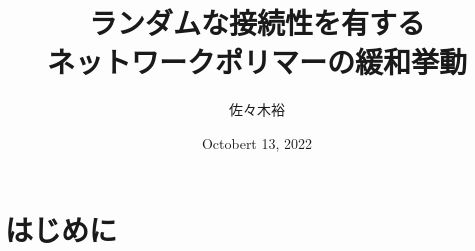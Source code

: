 \documentclass[12pt, dvipdfmx]{beamer}
\title
[ランダムな接続性を有するネットワークポリマーの緩和挙動]
{ランダムな接続性を有する\\ネットワークポリマーの緩和挙動}
\author[東亞合成　佐々木]{佐々木裕}
\institute[東亞合成]{東亞合成}
\date{Octobert 13, 2022}
\begin{document}
\begin{frame}[noframenumbering]\frametitle{}
	\titlepage
\end{frame}

\section{はじめに}
\end{document}
